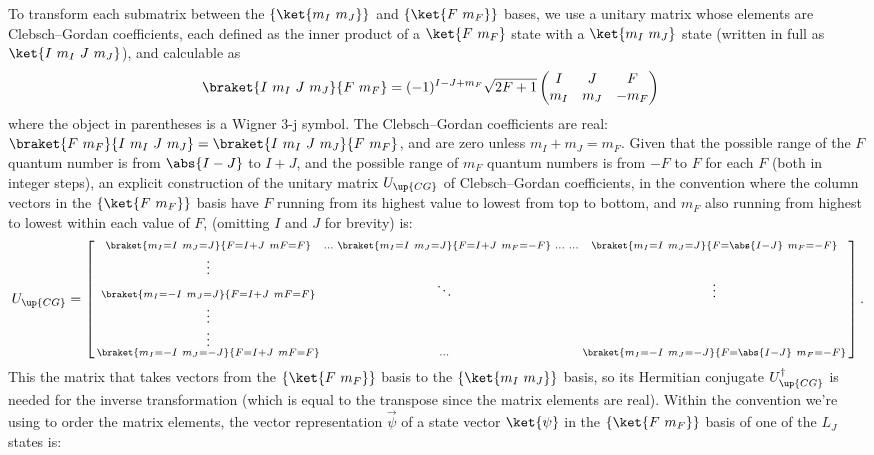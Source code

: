 To transform each submatrix between the $\{\ket{m_I\ m_J}\}$ and $\{\ket{F\ m_F}\}$ bases, we use a unitary matrix whose elements are Clebsch--Gordan coefficients, each defined as the inner product of a $\ket{F\ m_F}$ state with a $\ket{m_I\ m_J}$ state (written in full as $\ket{I\ m_I\ J\ m_J}$), and calculable as \cite{steck_rubidium_2015}
\begin{align}\label{eq:ClebschGordanCoeffs}
\braket{I\ m_I\ J\ m_J}{F\ m_F} &=
(-1)^{I - J + m_F}\sqrt{2F + 1}
\left(\begin{matrix}
I & J & F\\
m_I & m_J & -m_F\\
\end{matrix}\right)
\end{align}
where the object in parentheses is a Wigner $3$-j symbol. The Clebsch--Gordan coefficients are real: $\braket{F\ m_F}{I\ m_I\ J\ m_J} = \braket{I\ m_I\ J\ m_J}{F\ m_F}$, and are zero unless $m_I + m_J = m_F$.
Given that the possible range of the $F$ quantum number is from $\abs{I - J}$ to $I + J$, and the possible range of $m_F$ quantum numbers is from $-F$ to $F$ for each $F$ (both in integer steps), an explicit construction of the unitary matrix $U_\up{CG}$ of Clebsch--Gordan coefficients, in the convention where the column vectors in the $\{\ket{F\ m_F}\}$ basis have $F$ running from its highest value to lowest from top to bottom, and $m_F$ also running from highest to lowest within each value of $F$, (omitting $I$ and $J$ for brevity) is:
\begin{align}
U_\up{CG} = \left[\begin{smallmatrix}
\braket{m_I=I\ m_J=J}{F=I+J\ mF=F} & \hdots &
\braket{m_I=I\ m_J=J}{F=I+J\ m_F=-F} & \hdots &\hdots &
\braket{m_I=I\ m_J=J}{F=\abs{I - J}\ m_F=-F}\\
\vdots\\
\braket{m_I=-I\ m_J=J}{F=I+J\ mF=F} & & \ddots & & & \vdots\\
\vdots\\
\vdots\\
\braket{m_I=-I\ m_J=-J}{F=I+J\ mF=F} & & \hdots & & &
\braket{m_I=-I\ m_J=-J}{F=\abs{I - J}\ m_F=-F}\\
\end{smallmatrix}\right].
\end{align}
This the matrix that takes vectors from the $\{\ket{F\ m_F}\}$ basis to the $\{\ket{m_I\ m_J}\}$ basis, so its Hermitian conjugate $U^\dagger_\up{CG}$ is needed for the inverse transformation (which is equal to the transpose since the matrix elements are real). Within the convention we're using to order the matrix elements, the vector representation $\vec\psi$ of a state vector $\ket{\psi}$ in the $\{\ket{F\ m_F}\}$ basis of one of the $L_J$ states is:
